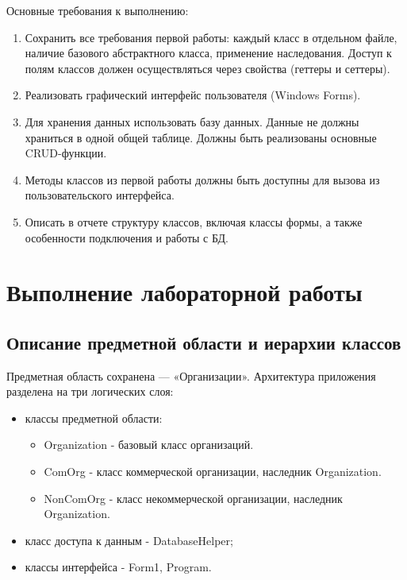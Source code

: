 \documentclass[oneside,a4paper,14pt]{extarticle}
\begin{document}
Основные требования к выполнению:
\begin{enumerate}
    \item Сохранить все требования первой работы: каждый класс в отдельном файле, наличие базового абстрактного класса, применение наследования. Доступ к полям классов должен осуществляться через свойства (геттеры и сеттеры).
    \item Реализовать графический интерфейс пользователя (Windows Forms).
    \item Для хранения данных использовать базу данных. Данные не должны храниться в одной общей таблице. Должны быть реализованы основные CRUD-функции.
    \item Методы классов из первой работы должны быть доступны для вызова из пользовательского интерфейса.
    \item Описать в отчете структуру классов, включая классы формы, а также особенности подключения и работы с БД.
\end{enumerate}

\newpage

\section*{Выполнение лабораторной работы}

\subsection*{Описание предметной области и иерархии классов}

Предметная область сохранена — «Организации». Архитектура приложения разделена на три логических слоя:
\begin{itemize}
    \item классы предметной области:
    \begin{itemize}
        \item Organization - базовый класс организаций.
        \item ComOrg - класс коммерческой организации, наследник Organization.
        \item NonComOrg - класс некоммерческой организации, наследник Organization.
    \end{itemize}

    \item класс доступа к данным - DatabaseHelper;
    \item классы интерфейса - Form1, Program.
\end{itemize}
\end{document}
